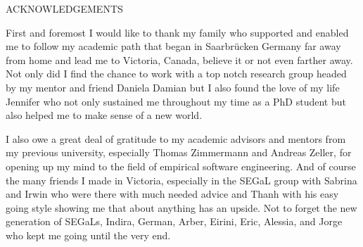 \newpage
{}

\begin{center}
ACKNOWLEDGEMENTS
\end{center}

First and foremost I would like to thank my family who supported and enabled me to follow my academic path that began in Saarbr{\"u}cken Germany far away from home and lead me to Victoria, Canada, believe it or not even farther away.
%
Not only did I find the chance to work with a top notch research group headed by my mentor and friend Daniela Damian but I also found the love of my life Jennifer who not only sustained me throughout my time as a PhD student but also helped me to make sense of a new world.

I also owe a great deal of gratitude to my academic advisors and mentors from my previous university, especially Thomas Zimmermann and Andreas Zeller, for opening up my mind to the field of empirical software engineering.
%
And of course the many friends I made in Victoria, especially in the SEGaL group with Sabrina and Irwin who were there with much needed advice and Thanh with his easy going style showing me that about anything has an upside.
Not to forget the new generation of SEGaLs, Indira, German, Arber, Eirini, Eric, Alessia, and Jorge who kept me going until the very end.




